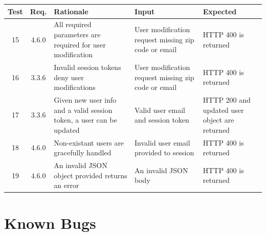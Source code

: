 \documentclass[12pt]{article}
\begin{document}
\setlength{\tabcolsep}{3mm}
\begin{tabular}{|c|c|p{5cm}|p{3cm}|p{3cm}|}
    \hline
    Test & Req.  & Rationale                                                            & Input                                               & Expected                                      \\

    \hline
    15   & 4.6.0 & All required parameters are required for user modification           & User modification request missing zip code or email & HTTP 400 is returned                          \\
    \hline
    16   & 3.3.6 & Invalid session tokens deny user modifications                       & User modification request missing zip code or email & HTTP 400 is returned                          \\
    \hline
    17   & 3.3.6 & Given new user info and a valid session token, a user can be updated & Valid user email and session token                  & HTTP 200 and updated user object are returned \\
    \hline
    18   & 4.6.0 & Non-existant users are gracefully handled                            & Invalid user email provided to session              & HTTP 400 is returned                          \\
    \hline
    19   & 4.6.0 & An invalid JSON object provided returns an error                     & An invalid JSON body                                & HTTP 400 is returned                          \\
    \hline
\end{tabular}

\newpage

\section{Known Bugs}
\end{document}
